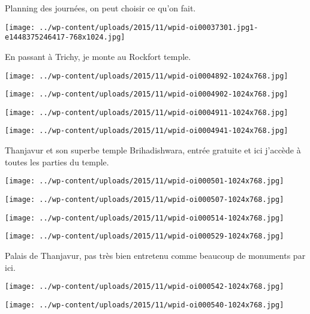  Planning des journées, on peut choisir ce qu'on fait. 
\begin{center} \texttt{[image: ../wp-content/uploads/2015/11/wpid-oi00037301.jpg1-e1448375246417-768x1024.jpg]} \end{center}

 En passant à Trichy, je monte au Rockfort temple. 
\begin{center} \texttt{[image: ../wp-content/uploads/2015/11/wpid-oi0004892-1024x768.jpg]} \end{center}
\begin{center} \texttt{[image: ../wp-content/uploads/2015/11/wpid-oi0004902-1024x768.jpg]} \end{center}
\begin{center} \texttt{[image: ../wp-content/uploads/2015/11/wpid-oi0004911-1024x768.jpg]} \end{center}
\begin{center} \texttt{[image: ../wp-content/uploads/2015/11/wpid-oi0004941-1024x768.jpg]} \end{center}

 Thanjavur et son superbe temple Brihadishwara, entrée gratuite et ici j'accède à toutes les parties du temple. 
\begin{center} \texttt{[image: ../wp-content/uploads/2015/11/wpid-oi000501-1024x768.jpg]} \end{center}
\begin{center} \texttt{[image: ../wp-content/uploads/2015/11/wpid-oi000507-1024x768.jpg]} \end{center}
\begin{center} \texttt{[image: ../wp-content/uploads/2015/11/wpid-oi000514-1024x768.jpg]} \end{center}
\begin{center} \texttt{[image: ../wp-content/uploads/2015/11/wpid-oi000529-1024x768.jpg]} \end{center}

 Palais de Thanjavur, pas très bien entretenu comme beaucoup de monuments par ici. 
\begin{center} \texttt{[image: ../wp-content/uploads/2015/11/wpid-oi000542-1024x768.jpg]} \end{center}
\begin{center} \texttt{[image: ../wp-content/uploads/2015/11/wpid-oi000540-1024x768.jpg]} \end{center}
\vspace{-\topsep}